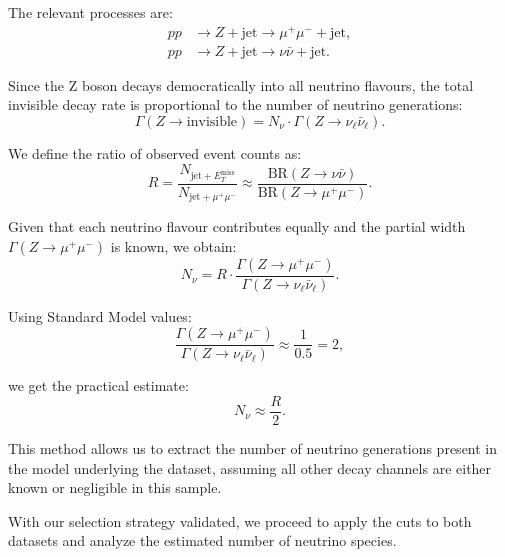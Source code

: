 The relevant processes are:
\begin{align*}
pp &\to Z + \text{jet} \to \mu^+ \mu^- + \text{jet}, \\
pp &\to Z + \text{jet} \to \nu \bar{\nu} + \text{jet}.
\end{align*}


Since the Z boson decays democratically into all neutrino flavours, the total invisible decay rate is proportional to the number of neutrino generations:
\begin{equation}
\Gamma(Z \to \text{invisible}) = N_\nu \cdot \Gamma(Z \to \nu_\ell \bar{\nu}_\ell).
\end{equation}

We define the ratio of observed event counts as:
\begin{equation}
R = \frac{N_{\text{jet} + E_T^{\text{miss}}}}{N_{\text{jet} + \mu^+ \mu^-}} \approx \frac{\text{BR}(Z \to \nu \bar{\nu})}{\text{BR}(Z \to \mu^+ \mu^-)}.
\end{equation}

Given that each neutrino flavour contributes equally and the partial width \( \Gamma(Z \to \mu^+ \mu^-) \) is known, we obtain:
\begin{equation}
N_\nu = R \cdot \frac{\Gamma(Z \to \mu^+ \mu^-)}{\Gamma(Z \to \nu_\ell \bar{\nu}_\ell)}.
\end{equation}

Using Standard Model values:
\[
\frac{\Gamma(Z \to \mu^+ \mu^-)}{\Gamma(Z \to \nu_\ell \bar{\nu}_\ell)} \approx \frac{1}{0.5} = 2,
\]


we get the practical estimate:
\begin{equation}
N_\nu \approx \frac{R}{2}.
\end{equation}

This method allows us to extract the number of neutrino generations present in the model underlying the dataset, assuming all other decay channels are either known or negligible in this sample.

With our selection strategy validated, we proceed to apply the cuts to both datasets and analyze the estimated number of neutrino species.

